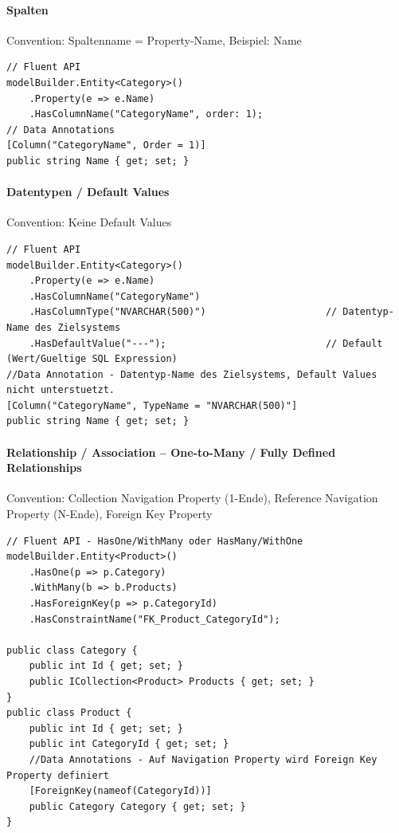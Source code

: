 \documentclass[
a4paper,
oneside,
10pt,
fleqn,
headsepline,
toc=listofnumbered, 
bibliography=totocnumbered]{scrartcl}
\begin{document}
\paragraph{Spalten}
Convention: Spaltenname = Property-Name, Beispiel: Name
\begin{lstlisting}
// Fluent API
modelBuilder.Entity<Category>()                         
    .Property(e => e.Name)
    .HasColumnName("CategoryName", order: 1);
// Data Annotations
[Column("CategoryName", Order = 1)]                     
public string Name { get; set; }
\end{lstlisting}

\paragraph{Datentypen / Default Values}
Convention: Keine Default Values
\begin{lstlisting}
// Fluent API
modelBuilder.Entity<Category>()                         
    .Property(e => e.Name)
    .HasColumnName("CategoryName")
    .HasColumnType("NVARCHAR(500)")                     // Datentyp-Name des Zielsystems
    .HasDefaultValue("---");                            // Default (Wert/Gueltige SQL Expression)
//Data Annotation - Datentyp-Name des Zielsystems, Default Values nicht unterstuetzt.
[Column("CategoryName", TypeName = "NVARCHAR(500)"] 
public string Name { get; set; }
\end{lstlisting}

\paragraph{Relationship / Association – One-to-Many / Fully Defined Relationships}
Convention: Collection Navigation Property (1-Ende), Reference Navigation Property (N-Ende), Foreign Key Property
\begin{lstlisting}
// Fluent API - HasOne/WithMany oder HasMany/WithOne
modelBuilder.Entity<Product>()
    .HasOne(p => p.Category)                            
    .WithMany(b => b.Products)
    .HasForeignKey(p => p.CategoryId)
    .HasConstraintName("FK_Product_CategoryId");

public class Category {
    public int Id { get; set; }
    public ICollection<Product> Products { get; set; }
}
public class Product {
    public int Id { get; set; }
    public int CategoryId { get; set; }
    //Data Annotations - Auf Navigation Property wird Foreign Key Property definiert
    [ForeignKey(nameof(CategoryId))]                        
    public Category Category { get; set; }
}
\end{lstlisting}
\end{document}
